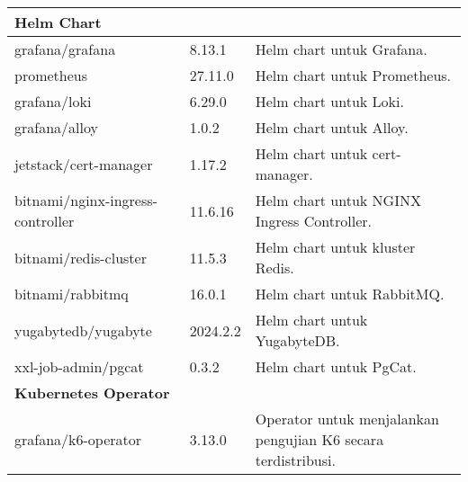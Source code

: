 \begin{longtable}{|p{}|p{}|p{}|}
    \multicolumn{3}{|l|}{\textbf{Helm Chart}}                                                                                                                                    \\
    \hline
    grafana/grafana                  & 8.13.1                     & Helm chart untuk Grafana.                                                                                    \\
    prometheus                       & 27.11.0                    & Helm chart untuk Prometheus.                                                                                 \\
    grafana/loki                     & 6.29.0                     & Helm chart untuk Loki.                                                                                       \\
    grafana/alloy                    & 1.0.2                      & Helm chart untuk Alloy.                                                                                      \\
    jetstack/cert-manager            & 1.17.2                     & Helm chart untuk cert-manager.                                                                               \\
    bitnami/nginx-ingress-controller & 11.6.16                    & Helm chart untuk NGINX Ingress Controller.                                                                   \\
    bitnami/redis-cluster            & 11.5.3                     & Helm chart untuk kluster Redis.                                                                              \\
    bitnami/rabbitmq                 & 16.0.1                     & Helm chart untuk RabbitMQ.                                                                                   \\
    yugabytedb/yugabyte              & 2024.2.2                   & Helm chart untuk YugabyteDB.                                                                                 \\
    xxl-job-admin/pgcat              & 0.3.2                      & Helm chart untuk PgCat.                                                                                      \\
    \hline

    \multicolumn{3}{|l|}{\textbf{Kubernetes Operator}}                                                                                                                           \\
    \hline
    grafana/k6-operator              & 3.13.0                     & Operator untuk menjalankan pengujian K6 secara terdistribusi.                                                \\
\end{longtable}
\endgroup